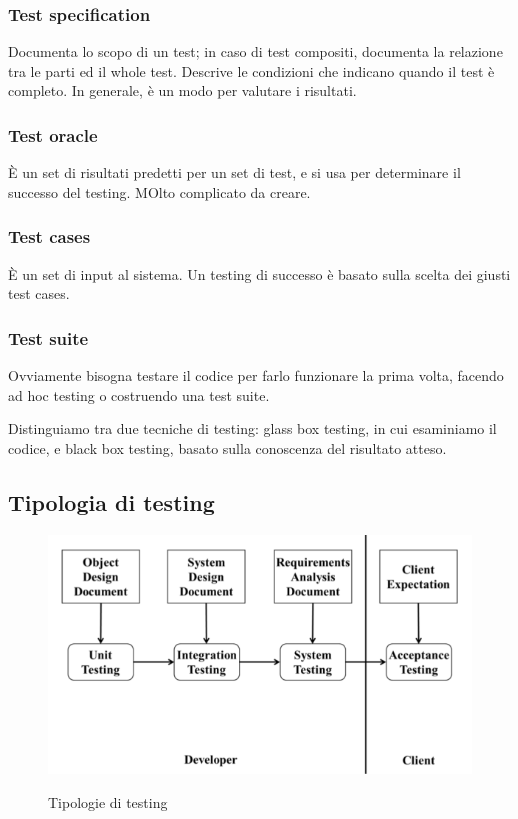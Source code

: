 \documentclass{article}
\begin{document}
\subsubsection{Test specification}

Documenta lo scopo di un test; in caso di test compositi, documenta la relazione tra le parti ed il whole
test.
Descrive le condizioni che indicano quando il test è completo. In generale, è un modo per valutare i
risultati.

\subsubsection{Test oracle}
È un set di risultati predetti per un set di test, e si usa per determinare il successo del testing.
MOlto complicato da creare.

\subsubsection{Test cases}
È un set di input al sistema. Un testing di successo è basato sulla scelta dei giusti test cases.

\subsubsection{Test suite}
Ovviamente bisogna testare il codice per farlo funzionare la prima volta, facendo ad hoc testing o costruendo
una test suite.

Distinguiamo tra due tecniche di testing: glass box testing,
in cui esaminiamo il codice, e black box testing, basato sulla conoscenza del risultato atteso.


\subsection{Tipologia di testing}


\begin{figure}[h!]
    \centering
    \includegraphics[width=0.5\linewidth]{imgs/11 - tipologie di testing.png}
    \label{fig:testing}
    \caption{Tipologie di testing}
\end{figure}
\end{document}
